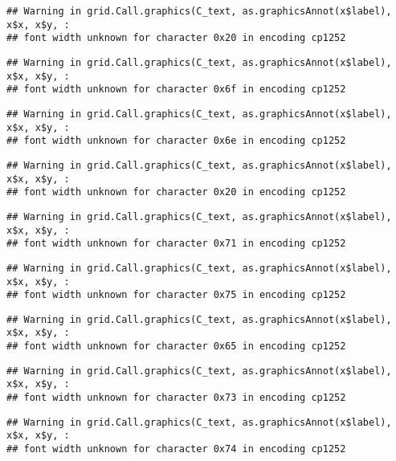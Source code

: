 \documentclass[
]{article}
\begin{document}
\begin{verbatim}
## Warning in grid.Call.graphics(C_text, as.graphicsAnnot(x$label), x$x, x$y, :
## font width unknown for character 0x20 in encoding cp1252
\end{verbatim}

\begin{verbatim}
## Warning in grid.Call.graphics(C_text, as.graphicsAnnot(x$label), x$x, x$y, :
## font width unknown for character 0x6f in encoding cp1252
\end{verbatim}

\begin{verbatim}
## Warning in grid.Call.graphics(C_text, as.graphicsAnnot(x$label), x$x, x$y, :
## font width unknown for character 0x6e in encoding cp1252
\end{verbatim}

\begin{verbatim}
## Warning in grid.Call.graphics(C_text, as.graphicsAnnot(x$label), x$x, x$y, :
## font width unknown for character 0x20 in encoding cp1252
\end{verbatim}

\begin{verbatim}
## Warning in grid.Call.graphics(C_text, as.graphicsAnnot(x$label), x$x, x$y, :
## font width unknown for character 0x71 in encoding cp1252
\end{verbatim}

\begin{verbatim}
## Warning in grid.Call.graphics(C_text, as.graphicsAnnot(x$label), x$x, x$y, :
## font width unknown for character 0x75 in encoding cp1252
\end{verbatim}

\begin{verbatim}
## Warning in grid.Call.graphics(C_text, as.graphicsAnnot(x$label), x$x, x$y, :
## font width unknown for character 0x65 in encoding cp1252
\end{verbatim}

\begin{verbatim}
## Warning in grid.Call.graphics(C_text, as.graphicsAnnot(x$label), x$x, x$y, :
## font width unknown for character 0x73 in encoding cp1252
\end{verbatim}

\begin{verbatim}
## Warning in grid.Call.graphics(C_text, as.graphicsAnnot(x$label), x$x, x$y, :
## font width unknown for character 0x74 in encoding cp1252
\end{verbatim}
\end{document}
